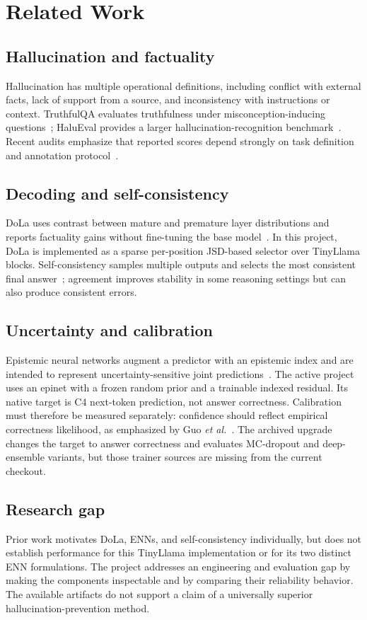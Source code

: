 \documentclass[conference]{IEEEtran}
\begin{document}
\section{Related Work}
\subsection{Hallucination and factuality}
Hallucination has multiple operational definitions, including conflict with external facts, lack of support from a source, and inconsistency with instructions or context. TruthfulQA evaluates truthfulness under misconception-inducing questions~\cite{lin2022truthfulqa}; HaluEval provides a larger hallucination-recognition benchmark~\cite{li2023halueval}. Recent audits emphasize that reported scores depend strongly on task definition and annotation protocol~\cite{ji2023survey,huang2024audit}.

\subsection{Decoding and self-consistency}
DoLa uses contrast between mature and premature layer distributions and reports factuality gains without fine-tuning the base model~\cite{chuang2024dola}. In this project, DoLa is implemented as a sparse per-position JSD-based selector over TinyLlama blocks. Self-consistency samples multiple outputs and selects the most consistent final answer~\cite{wang2023selfconsistency}; agreement improves stability in some reasoning settings but can also produce consistent errors.

\subsection{Uncertainty and calibration}
Epistemic neural networks augment a predictor with an epistemic index and are intended to represent uncertainty-sensitive joint predictions~\cite{osband2021enn}. The active project uses an epinet with a frozen random prior and a trainable indexed residual. Its native target is C4 next-token prediction, not answer correctness. Calibration must therefore be measured separately: confidence should reflect empirical correctness likelihood, as emphasized by Guo \emph{et al.}~\cite{guo2017calibration}. The archived upgrade changes the target to answer correctness and evaluates MC-dropout and deep-ensemble variants, but those trainer sources are missing from the current checkout.

\subsection{Research gap}
Prior work motivates DoLa, ENNs, and self-consistency individually, but does not establish performance for this TinyLlama implementation or for its two distinct ENN formulations. The project addresses an engineering and evaluation gap by making the components inspectable and by comparing their reliability behavior. The available artifacts do not support a claim of a universally superior hallucination-prevention method.
\end{document}

